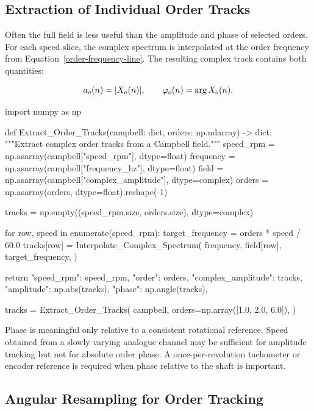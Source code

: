 \subsection{Extraction of Individual Order Tracks}

Often the full field is less useful than the amplitude and phase of selected
orders. For each speed slice, the complex spectrum is interpolated at the order
frequency from Equation~\eqref{order-frequency-line}. The resulting complex
track contains both quantities:

\begin{equation}
    a_o(n)=| {X_o(n)} |,
    \qquad
    \varphi_o(n)=\arg X_o(n).
\end{equation}

\begin{python}
import numpy as np


def Extract_Order_Tracks(campbell: dict,
                         orders: np.ndarray) -> dict:
    """Extract complex order tracks from a Campbell field."""
    speed_rpm = np.asarray(campbell["speed_rpm"], dtype=float)
    frequency = np.asarray(campbell["frequency_hz"], dtype=float)
    field = np.asarray(campbell["complex_amplitude"], dtype=complex)
    orders = np.asarray(orders, dtype=float).reshape(-1)

    tracks = np.empty((speed_rpm.size, orders.size), dtype=complex)

    for row, speed in enumerate(speed_rpm):
        target_frequency = orders * speed / 60.0
        tracks[row] = Interpolate_Complex_Spectrum(
            frequency,
            field[row],
            target_frequency,
        )

    return {
        "speed_rpm": speed_rpm,
        "order": orders,
        "complex_amplitude": tracks,
        "amplitude": np.abs(tracks),
        "phase": np.angle(tracks),
    }


tracks = Extract_Order_Tracks(
    campbell,
    orders=np.array([1.0, 2.0, 6.0]),
)
\end{python}

Phase is meaningful only relative to a consistent rotational reference. Speed
obtained from a slowly varying analogue channel may be sufficient for amplitude
tracking but not for absolute order phase. A once-per-revolution tachometer or
encoder reference is required when phase relative to the shaft is important.

\subsection{Angular Resampling for Order Tracking}

